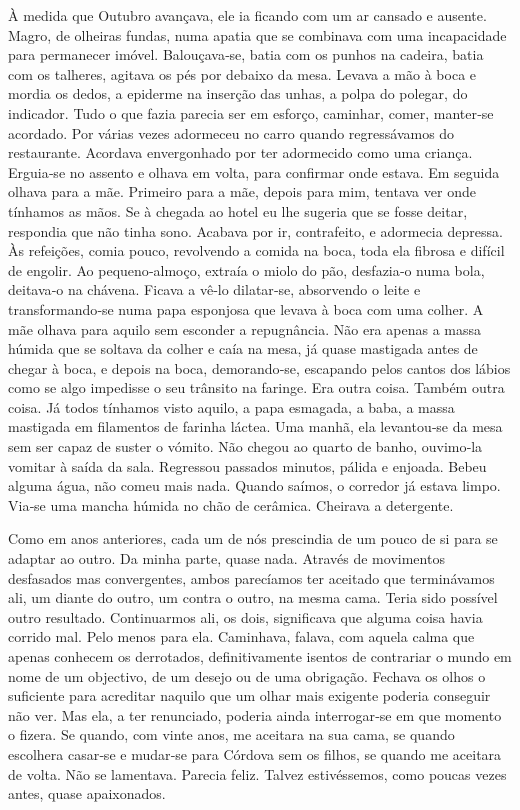 À medida que Outubro avançava, ele ia ficando com um ar cansado e
ausente. Magro, de olheiras fundas, numa apatia que se combinava com uma
incapacidade para permanecer imóvel. Balouçava­‑se, batia com os punhos
na cadeira, batia com os talheres, agitava os pés por debaixo da mesa.
Levava a mão à boca e mordia os dedos, a epiderme na inserção das unhas,
a polpa do polegar, do indicador. Tudo o que fazia parecia ser em
esforço, caminhar, comer, manter­‑se acordado. Por várias vezes
adormeceu no carro quando regressávamos do restaurante. Acordava
envergonhado por ter adormecido como uma criança. Erguia­‑se no assento
e olhava em volta, para confirmar onde estava. Em seguida olhava para a
mãe. Primeiro para a mãe, depois para mim, tentava ver onde tínhamos as
mãos. Se à chegada ao hotel eu lhe sugeria que se fosse deitar,
respondia que não tinha sono. Acabava por ir, contrafeito, e adormecia
depressa. Às refeições, comia pouco, revolvendo a comida na boca, toda
ela fibrosa e difícil de engolir. Ao pequeno­‑almoço, extraía o miolo do
pão, desfazia­‑o numa bola, deitava­‑o na chávena. Ficava a vê­‑lo
dilatar­‑se, absorvendo o leite e transformando­‑se numa papa esponjosa
que levava à boca com uma colher. A mãe olhava para aquilo sem esconder
a repugnância. Não era apenas a massa húmida que se soltava da colher e
caía na mesa, já quase mastigada antes de chegar à boca, e depois na
boca, demorando­‑se, escapando pelos cantos dos lábios como se algo
impedisse o seu trânsito na faringe. Era outra coisa. Também outra
coisa. Já todos tínhamos visto aquilo, a papa esmagada, a baba, a massa
mastigada em filamentos de farinha láctea. Uma manhã, ela levantou­‑se
da mesa sem ser capaz de suster o vómito. Não chegou ao quarto de banho,
ouvimo­‑la vomitar à saída da sala. Regressou passados minutos, pálida e
enjoada. Bebeu alguma água, não comeu mais nada. Quando saímos, o
corredor já estava limpo. Via­‑se uma mancha húmida no chão de cerâmica.
Cheirava a detergente.

Como em anos anteriores, cada um de nós prescindia de um pouco de si
para se adaptar ao outro. Da minha parte, quase nada. Através de
movimentos desfasados mas convergentes, ambos parecíamos ter aceitado
que terminávamos ali, um diante do outro, um contra o outro, na mesma
cama. Teria sido possível outro resultado. Continuarmos ali, os dois,
significava que alguma coisa havia corrido mal. Pelo menos para ela.
Caminhava, falava, com aquela calma que apenas conhecem os derrotados,
definitivamente isentos de contrariar o mundo em nome de um objectivo,
de um desejo ou de uma obrigação. Fechava os olhos o suficiente para
acreditar naquilo que um olhar mais exigente poderia conseguir não ver.
Mas ela, a ter renunciado, poderia ainda interrogar­‑se em que momento o
fizera. Se quando, com vinte anos, me aceitara na sua cama, se quando
escolhera casar­‑se e mudar­‑se para Córdova sem os filhos, se quando me
aceitara de volta. Não se lamentava. Parecia feliz. Talvez estivéssemos,
como poucas vezes antes, quase apaixonados.

